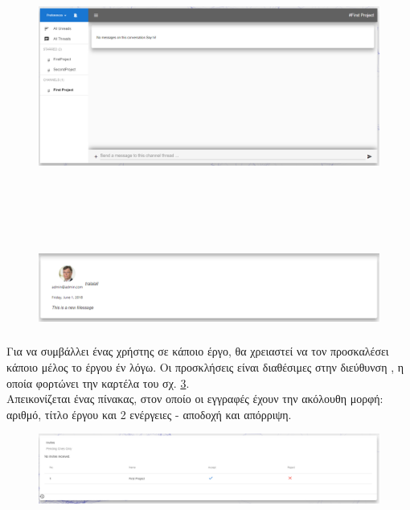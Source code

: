 \begin{figure}[!htb]
\includegraphics[width=\columnwidth, height=10cm]{images/userChat.png}
\caption{}
\label{fig:userChat}
\end{figure}

\begin{figure}[!htb]
\centering
\includegraphics[width=\linewidth]{images/userChatMessage.png}
\caption{}
\label{fig:userChatMessage}
\end{figure}

\subsubsection*{}
\pSpace Για να συμβάλλει ένας χρήστης σε κάποιο έργο, θα χρειαστεί να τον προσκαλέσει κάποιο μέλος το έργου έν λόγω. Οι προσκλήσεις είναι διαθέσιμες στην διεύθυνση , η οποία φορτώνει την καρτέλα του σχ. \ref{fig:userInvites}.\\
\pSpace Απεικονίζεται ένας πίνακας, στον οποίο οι εγγραφές έχουν την ακόλουθη μορφή: αριθμό, τίτλο έργου και 2 ενέργειες - αποδοχή και απόρριψη.

\begin{figure}[!htb]
\includegraphics[width=\linewidth]{images/userInvite.png}
\caption{}
\label{fig:userInvites}
\end{figure}

